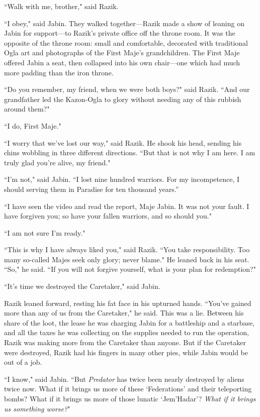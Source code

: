 \documentclass[twoside,letterpaper,12pt]{memoir}
\begin{document}
``Walk with me, brother," said Razik.

``I obey," said Jabin. They walked together---Razik made a show of leaning on Jabin for support---to Razik's private office off the throne room. It was the opposite of the throne room: small and comfortable, decorated with traditional Ogla art and photographs of the First Maje's grandchildren. The First Maje offered Jabin a seat, then collapsed into his own chair---one which had much more padding than the iron throne.

``Do you remember, my friend, when we were both boys?" said Razik. ``And our grandfather led the Kazon-Ogla to glory without needing any of this rubbish around them?"

``I do, First Maje."

``I worry that we've lost our way," said Razik. He shook his head, sending his chins wobbling in three different directions. ``But that is not why I am here. I am truly glad you're alive, my friend."

``I'm not," said Jabin. ``I lost nine hundred warriors. For my incompetence, I should serving them in Paradise for ten thousand years.''

``I have seen the video and read the report, Maje Jabin. It was not your fault. I have forgiven you; so have your fallen warriors, and so should you."

``I am not sure I'm ready."

``This is why I have always liked you," said Razik. ``You take responsibility. Too many so-called Majes seek only glory; never blame." He leaned back in his seat. ``So," he said. ``If you will not forgive yourself, what is your plan for redemption?"

``It's time we destroyed the Caretaker," said Jabin.

Razik leaned forward, resting his fat face in his upturned hands. ``You've gained more than any of us from the Caretaker," he said. This was a lie. Between his share of the loot, the lease he was charging Jabin for a battleship and a starbase, and all the taxes he was collecting on the supplies needed to run the operation, Razik was making more from the Caretaker than anyone. But if the Caretaker were destroyed, Razik had his fingers in many other pies, while Jabin would be out of a job.

``I know," said Jabin. ``But \textit{Predator} has twice been nearly destroyed by aliens twice now. What if it brings us more of these `Federations' and their teleporting bombs? What if it brings us more of those lunatic `Jem'Hadar'? \textit{What if it brings us something worse?}"
\end{document}
